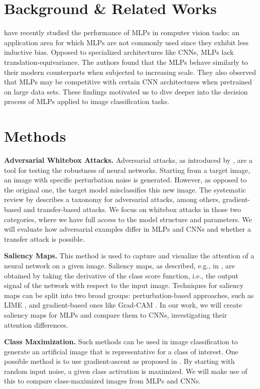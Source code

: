 \documentclass{article}
\theoremstyle{plain}
\theoremstyle{definition}
\theoremstyle{remark}
\begin{document}
\section{Background \& Related Works}
\citet{bachmann2023scaling} have recently studied the performance of MLPs in computer vision tasks: an application area for which MLPs are not commonly used since they exhibit less inductive bias. Opposed to specialized architectures like CNNs, MLPs lack translation-equivariance. The authors found that the MLPs behave similarly to their modern counterparts when subjected to increasing scale. They also observed that MLPs may be competitive with certain CNN architectures when pretrained on large data sets. These findings motivated us to dive deeper into the decision process of MLPs applied to image classification tasks.

\section{Methods}
\textbf{Adversarial Whitebox Attacks.}
Adversarial attacks, as introduced by \citet{szegedy2014intriguing}, are a tool for testing the robustness of neural networks. Starting from a target image, an image with specific perturbation noise is generated. However, as opposed to the original one, the target model misclassifies this new image. The systematic review by \cite{LONG2022102847} describes a taxonomy for adversarial attacks, among others, gradient-based and transfer-based attacks. We focus on whitebox attacks in those two categories, where we have full access to the model structure and parameters. We will evaluate how adversarial examples differ in MLPs and CNNs and whether a transfer attack is possible.

\textbf{Saliency Maps.}
This method is used to capture and visualize the attention of a neural network on a given image. 
Saliency maps, as described, e.g., in \citet{Simonyan14a}, are obtained by taking the derivative of the class score function, i.e., the output signal of the network with respect to the input image. Techniques for saliency maps can be split into two broad groups: perturbation-based approaches, such as LIME \cite{ribeiro2016why}, and
gradient-based ones like Grad-CAM \cite{Selvaraju_2019}.
In our work, we will create saliency maps for MLPs and compare them to CNNs, investigating their attention differences.

\textbf{Class Maximization.}
Such methods can be used in image classification to generate an artificial image that is representative for a class of interest. One possible method is to use gradient-ascent as proposed in \citet{erhan}. By starting with random input noise, a given class activation is maximized. We will make use of this to compare class-maximized images from MLPs and CNNs.
\end{document}
